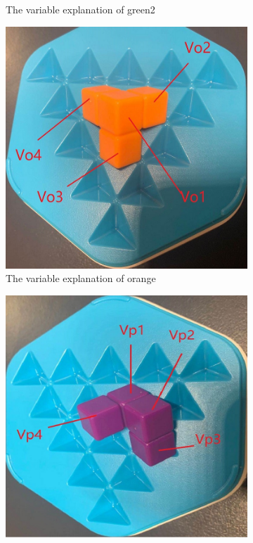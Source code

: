 \begin{figure}[htbp]
\begin{subfigure}[b]{0.25\textwidth}
\caption{The variable explanation of green2}
  \label{fig:3Dgreen2}
\end{subfigure}
\begin{subfigure}[b]{0.25\textwidth}
\centering
\includegraphics[width=\textwidth]{figs/3Dorange.jpg}
\caption{The variable explanation of orange}
  \label{fig:3Dorange}
\end{subfigure}
\begin{subfigure}[b]{0.25\textwidth}
\centering
\includegraphics[width=\textwidth]{figs/3Dpurple.jpg}

\end{subfigure}
\end{figure}
